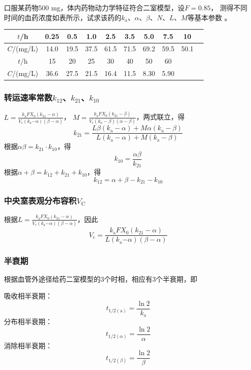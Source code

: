 \documentclass[dvipsnames, svgnames, x11names]{beamer}
\begin{document}
\begin{frame}[t]
    \frametitle{}
    \begin{example}
        口服某药物500 mg，体内药物动力学特征符合二室模型，设$F=0.85$， 测得不同时间的血药浓度如表所示，试求该药的$k_\mathrm{a}$、$\alpha$、$\beta$、$N$、$L$、$M$等基本参数 。
        \begin{table}
            \centering
            \begin{tabular}{cccccccccc}
                \bottomrule
                $t$/h & 0.25 & 0.5 & 1.0 & 2.5 & 3.5 & 5.0 & 7.5 & 10 \\ \hline
                $C$/(mg/L) & 14.0 & 19.5 & 37.5 & 61.5 & 71.5 & 69.2 & 59.5 & 50.1 \\ \hline \hline
                $t$/h & 15 & 20 & 25 & 30 & 40 & 50 & 60 \\ \hline
                $C$/(mg/L) & 36.6 & 27.5 & 21.5 & 16.4 & 11.5 & 8.30 & 5.90 \\ \toprule
            \end{tabular}
        \end{table}
    \end{example}
\end{frame}


\begin{frame}
    \frametitle{转运速率常数$k_{12}$、$k_{21}$、$k_{10}$}
        $L= \frac{k_\text{a}FX_0(k_{21}-\alpha)}{V_\text{c}(k_\text{a}{ - \alpha })(\beta-\alpha)}$，
        $M =\frac{k_\text{a}{FX_0 }(k_{21}-{\beta})}{V_\text{c}{ ( k _ a - {\beta })}(\alpha-{\beta})} $，两式联立，得
        \[
            k_{21}=\frac{{L\beta(k_\mathrm{a}-\alpha)}+{M\alpha(k_\mathrm{a}-{\beta})}}{{L(k_\mathrm{a}-\alpha)}+{M(k_\mathrm{a}-{\beta})}}
        \]
        根据$\alpha  \beta = k_{21}\cdot k_{10}$，得
        \[
            k_{10}=\frac{\alpha  \beta}{k_{21}}
        \]
        根据$\alpha + \beta = k_{12}+k_{21}+k_{10}$，得
        \[
            k_{12} = \alpha + \beta -k_{21} - k_{10}
        \]
\end{frame}


\begin{frame}
    \frametitle{中央室表观分布容积$V_\mathrm{C}$}
    根据$L= \frac{k_\text{a}FX_0(k_{21}-\alpha)}{V_\text{c}(k_\text{a}{ - \alpha })(\beta-\alpha)}$，因此
    \[
        V_\text{c}= \frac{k_\text{a}FX_0(k_{21}-\alpha)}{L(k_\text{a}{ - \alpha })(\beta-\alpha)}
    \]
\end{frame}


\begin{frame}
    \frametitle{半衰期}
    根据血管外途径给药二室模型的3个时相，相应有3个半衰期，即

    吸收相半衰期：
    \[
        t_{1/2(\mathrm{a})} = \frac{\ln2}{k_\mathrm{a}}
    \]
    分布相半衰期：
    \[
        t_{1/2(\alpha)} = \frac{\ln2}{\alpha}
    \]
    消除相半衰期：
    \[
        t_{1/2(\beta)} = \frac{\ln2}{\beta}
    \]
\end{frame}
\end{document}
